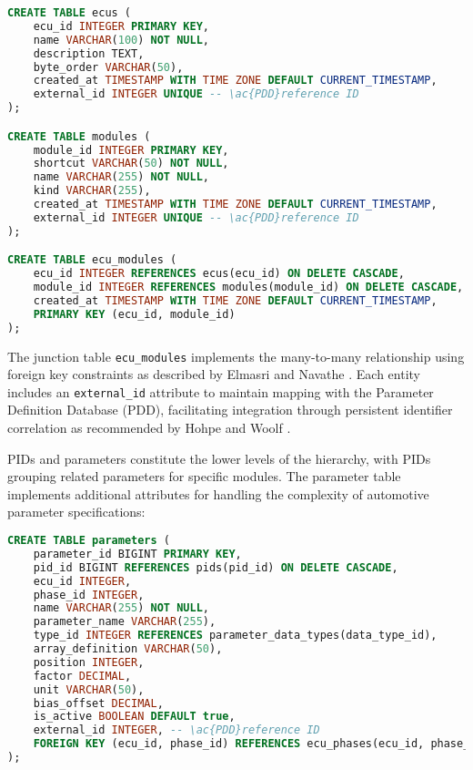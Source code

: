 \begin{lstlisting}[language=SQL, caption={ECU and Module Table Implementation}, label={lst:ecu-module-tables}]
CREATE TABLE ecus (
    ecu_id INTEGER PRIMARY KEY,
    name VARCHAR(100) NOT NULL,
    description TEXT,
    byte_order VARCHAR(50),
    created_at TIMESTAMP WITH TIME ZONE DEFAULT CURRENT_TIMESTAMP,
    external_id INTEGER UNIQUE -- \ac{PDD}reference ID
);

CREATE TABLE modules (
    module_id INTEGER PRIMARY KEY,
    shortcut VARCHAR(50) NOT NULL,
    name VARCHAR(255) NOT NULL,
    kind VARCHAR(255),
    created_at TIMESTAMP WITH TIME ZONE DEFAULT CURRENT_TIMESTAMP,
    external_id INTEGER UNIQUE -- \ac{PDD}reference ID
);

CREATE TABLE ecu_modules (
    ecu_id INTEGER REFERENCES ecus(ecu_id) ON DELETE CASCADE,
    module_id INTEGER REFERENCES modules(module_id) ON DELETE CASCADE,
    created_at TIMESTAMP WITH TIME ZONE DEFAULT CURRENT_TIMESTAMP,
    PRIMARY KEY (ecu_id, module_id)
);
\end{lstlisting}

The junction table \texttt{ecu\_modules} implements the many-to-many relationship using foreign key constraints as described by Elmasri and Navathe \cite{elmasri2015fundamentals}. Each entity includes an \texttt{external\_id} attribute to maintain mapping with the Parameter Definition Database (PDD), facilitating integration through persistent identifier correlation as recommended by Hohpe and Woolf \cite{hohpe2002enterprise}.

\acp{PID} and parameters constitute the lower levels of the hierarchy, with \acp{PID} grouping related parameters for specific modules. The parameter table implements additional attributes for handling the complexity of automotive parameter specifications:

\begin{lstlisting}[language=SQL, caption={Parameter Table Implementation}, label={lst:parameter-table}]
CREATE TABLE parameters (
    parameter_id BIGINT PRIMARY KEY,
    pid_id BIGINT REFERENCES pids(pid_id) ON DELETE CASCADE,
    ecu_id INTEGER,
    phase_id INTEGER,
    name VARCHAR(255) NOT NULL,
    parameter_name VARCHAR(255),
    type_id INTEGER REFERENCES parameter_data_types(data_type_id),
    array_definition VARCHAR(50),
    position INTEGER,
    factor DECIMAL,
    unit VARCHAR(50),
    bias_offset DECIMAL,
    is_active BOOLEAN DEFAULT true,
    external_id INTEGER, -- \ac{PDD}reference ID
    FOREIGN KEY (ecu_id, phase_id) REFERENCES ecu_phases(ecu_id, phase_id)
);
\end{lstlisting}

